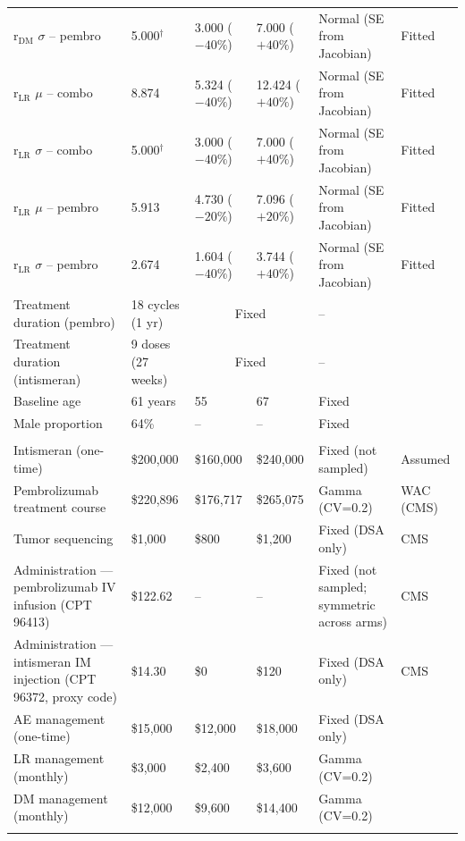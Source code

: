\documentclass[11pt,a4paper]{article}
\begin{document}
\begin{landscape}
\begin{table}[p]
\begin{tabularx}{\linewidth}{@{}>{\raggedright\arraybackslash}Xlll>{\raggedright\arraybackslash}Xl@{}}
r$_{\text{DM}}$ $\sigma$ -- pembro & 5.000$^{\dagger}$ & 3.000 ($-40\%$) & 7.000 ($+40\%$) & Normal (SE from Jacobian) & Fitted \\
r$_{\text{LR}}$ $\mu$ -- combo & 8.874 & 5.324 ($-40\%$) & 12.424 ($+40\%$) & Normal (SE from Jacobian) & Fitted \\
r$_{\text{LR}}$ $\sigma$ -- combo & 5.000$^{\dagger}$ & 3.000 ($-40\%$) & 7.000 ($+40\%$) & Normal (SE from Jacobian) & Fitted \\
r$_{\text{LR}}$ $\mu$ -- pembro & 5.913 & 4.730 ($-20\%$) & 7.096 ($+20\%$) & Normal (SE from Jacobian) & Fitted \\
r$_{\text{LR}}$ $\sigma$ -- pembro & 2.674 & 1.604 ($-40\%$) & 3.744 ($+40\%$) & Normal (SE from Jacobian) & Fitted \\
Treatment duration (pembro) & 18 cycles (1 yr) & \multicolumn{2}{c}{Fixed} & -- & \cite{khattak2026} \\
Treatment duration (intismeran) & 9 doses (27 weeks) & \multicolumn{2}{c}{Fixed} & -- & \cite{khattak2026} \\
Baseline age & 61 years & 55 & 67 & Fixed & \cite{khattak2026} \\
Male proportion & 64\% & -- & -- & Fixed & \cite{khattak2026} \\
\midrule
\multicolumn{6}{c}{\textit{Costs (2026 USD)}} \\
Intismeran (one-time) & \$200,000 & \$160,000 & \$240,000 & Fixed (not sampled) & Assumed \\
Pembrolizumab treatment course & \$220,896 & \$176,717 & \$265,075 & Gamma (CV=0.2) & WAC (CMS) \\
Tumor sequencing & \$1,000 & \$800 & \$1,200 & Fixed (DSA only) & CMS \\
Administration --- \mbox{pembrolizumab} IV infusion (CPT 96413) & \$122.62 & -- & -- & Fixed (not sampled; symmetric across arms) & CMS \\
Administration --- intismeran IM injection (CPT 96372, proxy code) & \$14.30 & \$0 & \$120 & Fixed (DSA only) & CMS \\
AE management (one-time) & \$15,000 & \$12,000 & \$18,000 & Fixed (DSA only) & \cite{zhang2023} \\
LR management (monthly) & \$3,000 & \$2,400 & \$3,600 & Gamma (CV=0.2) & \cite{zhang2023} \\
DM management (monthly) & \$12,000 & \$9,600 & \$14,400 & Gamma (CV=0.2) & \cite{bensimon2019} \\
\midrule
\multicolumn{6}{c}{\textit{Utilities}} \\

\end{tabularx}
\end{table}
\end{landscape}
\end{document}
